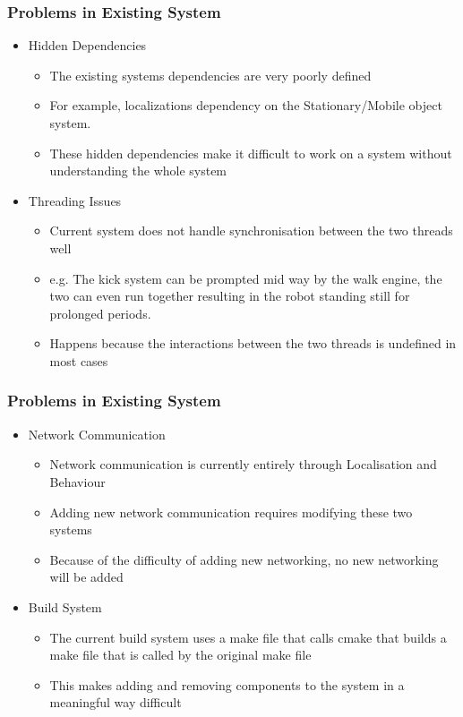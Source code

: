 \documentclass{beamer}
\begin{document}
\begin{frame}
	\frametitle{Problems in Existing System}
	\begin{itemize}
		\item Hidden Dependencies
			\begin{itemize}
				\item The existing systems dependencies are very poorly defined
				\item For example, localizations dependency on the Stationary/Mobile object system.
				\item These hidden dependencies make it difficult to work on a system without understanding the whole system
			\end{itemize}
	
		\item Threading Issues
			\begin{itemize}
				\item Current system does not handle synchronisation between the two threads well
				\item e.g. The kick system can be prompted mid way by the walk engine, the two can even run together resulting in the robot standing still for prolonged periods.
				\item Happens because the interactions between the two threads is undefined in most cases
			\end{itemize}
	\end{itemize}
\end{frame}

\begin{frame}
	\frametitle{Problems in Existing System}
	\begin{itemize}			
		\item Network Communication
			\begin{itemize}
				\item Network communication is currently entirely through Localisation and Behaviour
				\item Adding new network communication requires modifying these two systems
				\item Because of the difficulty of adding new networking, no new networking will be added
			\end{itemize}
			
		\item Build System
			\begin{itemize}
				\item The current build system uses a make file that calls cmake that builds a make file that is called by the original make file
				\item This makes adding and removing components to the system in a meaningful way difficult
			\end{itemize}
	\end{itemize}
\end{frame}
\end{document}
